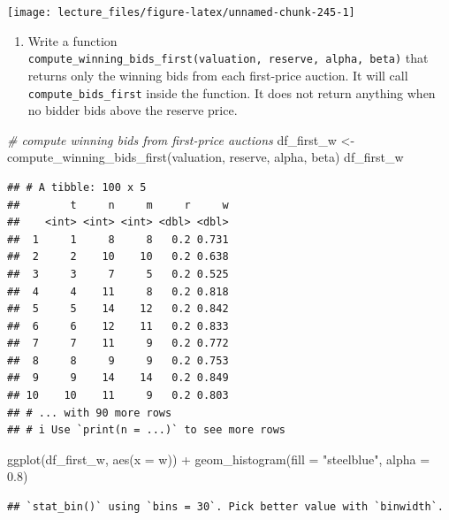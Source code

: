 \documentclass[
]{book}
\newenvironment{Shaded}{\begin{snugshade}}{\end{snugshade}}
\newcommand{\AttributeTok}[1]{\textcolor[rgb]{0.77,0.63,0.00}{#1}}
\newcommand{\CommentTok}[1]{\textcolor[rgb]{0.56,0.35,0.01}{\textit{#1}}}
\newcommand{\FloatTok}[1]{\textcolor[rgb]{0.00,0.00,0.81}{#1}}
\newcommand{\FunctionTok}[1]{\textcolor[rgb]{0.00,0.00,0.00}{#1}}
\newcommand{\NormalTok}[1]{#1}
\newcommand{\OtherTok}[1]{\textcolor[rgb]{0.56,0.35,0.01}{#1}}
\newcommand{\SpecialCharTok}[1]{\textcolor[rgb]{0.00,0.00,0.00}{#1}}
\newcommand{\StringTok}[1]{\textcolor[rgb]{0.31,0.60,0.02}{#1}}
\providecommand{\tightlist}{%
  \setlength{\itemsep}{0pt}\setlength{\parskip}{0pt}}
\begin{document}
\begin{center}\texttt{[image: lecture\_files/figure-latex/unnamed-chunk-245-1]} \end{center}

\begin{enumerate}
\def\labelenumi{\arabic{enumi}.}
\setcounter{enumi}{5}
\tightlist
\item
  Write a function \texttt{compute\_winning\_bids\_first(valuation,\ reserve,\ alpha,\ beta)} that returns only the winning bids from each first-price auction. It will call \texttt{compute\_bids\_first} inside the function. It does not return anything when no bidder bids above the reserve price.
\end{enumerate}

\begin{Shaded}
\begin{Highlighting}[]
\CommentTok{\# compute winning bids from first{-}price auctions}
\NormalTok{df\_first\_w }\OtherTok{\textless{}{-}}
  \FunctionTok{compute\_winning\_bids\_first}\NormalTok{(valuation, reserve, alpha, beta)}
\NormalTok{df\_first\_w}
\end{Highlighting}
\end{Shaded}

\begin{verbatim}
## # A tibble: 100 x 5
##        t     n     m     r     w
##    <int> <int> <int> <dbl> <dbl>
##  1     1     8     8   0.2 0.731
##  2     2    10    10   0.2 0.638
##  3     3     7     5   0.2 0.525
##  4     4    11     8   0.2 0.818
##  5     5    14    12   0.2 0.842
##  6     6    12    11   0.2 0.833
##  7     7    11     9   0.2 0.772
##  8     8     9     9   0.2 0.753
##  9     9    14    14   0.2 0.849
## 10    10    11     9   0.2 0.803
## # ... with 90 more rows
## # i Use `print(n = ...)` to see more rows
\end{verbatim}

\begin{Shaded}
\begin{Highlighting}[]
\FunctionTok{ggplot}\NormalTok{(df\_first\_w, }\FunctionTok{aes}\NormalTok{(}\AttributeTok{x =}\NormalTok{ w)) }\SpecialCharTok{+} \FunctionTok{geom\_histogram}\NormalTok{(}\AttributeTok{fill =} \StringTok{"steelblue"}\NormalTok{, }\AttributeTok{alpha =} \FloatTok{0.8}\NormalTok{)}
\end{Highlighting}
\end{Shaded}

\begin{verbatim}
## `stat_bin()` using `bins = 30`. Pick better value with `binwidth`.
\end{verbatim}
\end{document}
